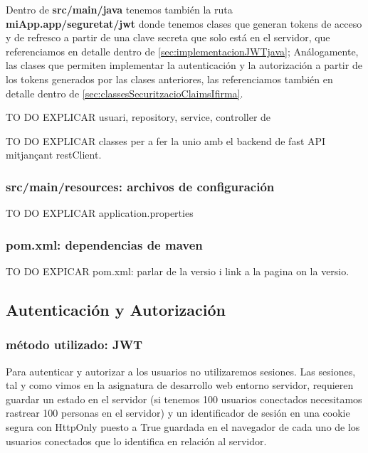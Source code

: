 \documentclass[a4paper,12pt]{report}
\begin{document}
				
				
				Dentro de \textbf{src/main/java} tenemos también la ruta \textbf{miApp.app/seguretat/jwt} donde tenemos clases que generan tokens de acceso y de refresco  a partir de una clave secreta que solo está en el servidor, que referenciamos en detalle dentro de \ref{sec:implementacionJWTjava}; Análogamente, las clases que permiten implementar la autenticación y la autorización a partir de los tokens generados por las clases anteriores, las referenciamos también en detalle dentro de \ref{sec:classesSecuritzacioClaimsIfirma}.
				
				
				TO DO EXPLICAR 	\hspace{3em} usuari, repository, service, controller de 
			
				TO DO EXPLICAR 	\hspace{3em} classes per a fer la unio amb el backend de fast API mitjançant restClient.
				
				
				
				\subsubsection{src/main/resources: archivos de configuración}
				
				TO DO EXPLICAR application.properties
				
				\subsubsection{pom.xml: dependencias de maven}
				
				
				 
				
				TO DO EXPICAR pom.xml: parlar de la versio i link a la pagina on la versio.
				
				
			
				
				\subsection{Autenticación y Autorización}
				
				\subsubsection{método utilizado: JWT}
				
				Para autenticar y autorizar a los usuarios no utilizaremos sesiones. Las sesiones, tal y como vimos en la asignatura de desarrollo web entorno servidor, requieren guardar un estado en el servidor (si tenemos 100 usuarios conectados necesitamos rastrear 100 personas en el servidor) y un identificador de sesión en una cookie segura con HttpOnly puesto a True guardada en el navegador de cada uno de los usuarios conectados que lo identifica en relación al servidor.
				
\end{document}
